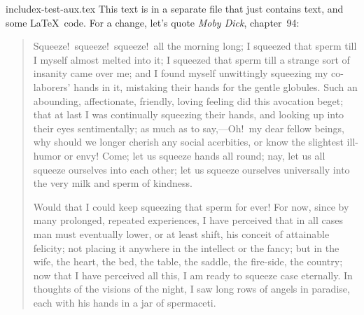 
\begin{filecontents}{includex-test-aux.tex}
This text is in a separate file that just contains text, and some \LaTeX\ code.
For a change, let's quote \emph{Moby Dick}, chapter~94:
\begin{quotation} %
  Squeeze!\ squeeze!\ squeeze!\ all the morning long; I squeezed that sperm
  till I myself almost melted into it; I squeezed that sperm till a strange
  sort of insanity came over me; and I found myself unwittingly squeezing my
  co-laborers' hands in it, mistaking their hands for the gentle globules.
  Such an abounding, affectionate, friendly, loving feeling did this avocation
  beget; that at last I was continually squeezing their hands, and looking up
  into their eyes sentimentally; as much as to say,---Oh!\ my dear fellow
  beings, why should we longer cherish any social acerbities, or know the
  slightest ill-humor or envy!  Come; let us squeeze hands all round; nay, let
  us all squeeze ourselves into each other; let us squeeze ourselves
  universally into the very milk and sperm of kindness.

  Would that I could keep squeezing that sperm for ever! For now, since by many
  prolonged, repeated experiences, I have perceived that in all cases man must
  eventually lower, or at least shift, his conceit of attainable felicity; not
  placing it anywhere in the intellect or the fancy; but in the wife, the
  heart, the bed, the table, the saddle, the fire-side, the country; now that I
  have perceived all this, I am ready to squeeze case eternally.  In thoughts
  of the visions of the night, I saw long rows of angels in paradise, each with
  his hands in a jar of spermaceti.
\end{quotation}
\end{filecontents}
